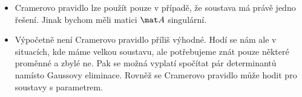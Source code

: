 \begin{itemize}
    \item Cramerovo pravidlo lze použít pouze v případě, že soustava má právě jedno řešení. Jinak bychom měli matici $\mat A$ singulární.
    \item Výpočetně není Cramerovo pravidlo příliš výhodné. Hodí se nám ale v situacích, kde máme velkou soustavu, ale potřebujeme znát pouze některé proměnné a zbylé ne. Pak se možná vyplatí spočítat pár determinantů namísto Gaussovy eliminace. Rovněž se Cramerovo pravidlo může hodit pro soustavy s parametrem.
\end{itemize}